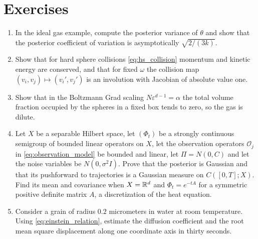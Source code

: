 \section*{Exercises}
\begin{enumerate}
\item In the ideal gas example, compute the posterior variance of $\theta$ and show that the posterior coefficient of variation is asymptotically $\sqrt{2/(3k)}$.
\item Show that for hard sphere collisions \eqref{eq:hs_collision} momentum and kinetic energy are conserved, and that for fixed $\omega$ the collision map $(v_i,v_j)\mapsto(v_i',v_j')$ is an involution with Jacobian of absolute value one.
\item Show that in the Boltzmann Grad scaling $N\varepsilon^{d-1} = \alpha$ the total volume fraction occupied by the spheres in a fixed box tends to zero, so the gas is dilute.
\item Let $X$ be a separable Hilbert space, let $(\Phi_t)$ be a strongly continuous semigroup of bounded linear operators on $X$, let the observation operators $\mathcal O_j$ in \eqref{eq:observation_model} be bounded and linear, let $\Pi = N(0,C)$ and let the noise variables be $N(0,\sigma^2I)$. Prove that the posterior is Gaussian and that its pushforward to trajectories is a Gaussian measure on $C([0,T];X)$. Find its mean and covariance when $X = \mathbb{R}^d$ and $\Phi_t = e^{-tA}$ for a symmetric positive definite matrix $A$, a discretization of the heat equation.
\item Consider a grain of radius $0.2$ micrometers in water at room temperature. Using \eqref{eq:einstein_relation}, estimate the diffusion coefficient and the root mean square displacement along one coordinate axis in thirty seconds.
\end{enumerate}
